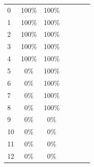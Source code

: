 \begin{table}[htbp]
{\begin{tabular}{lcccccc}
0 & 100\% & 100\% & & & & \\
1 & 100\% & 100\% & & & & \\
2 & 100\% & 100\% & & & & \\
3 & 100\% & 100\% & & & & \\
4 & 100\% & 100\% & & & & \\
5 & 0\% & 100\% & & & & \\
6 & 0\% & 100\% & & & & \\
7 & 0\% & 100\% & & & & \\
8 & 0\% & 100\% & & & & \\
9 & 0\% & 0\% & & & & \\
10 & 0\% & 0\% & & & & \\
11 & 0\% & 0\% & & & & \\
12 & 0\% & 0\% & & & & \\
\bottomrule
\end{tabular}}
\end{table}
